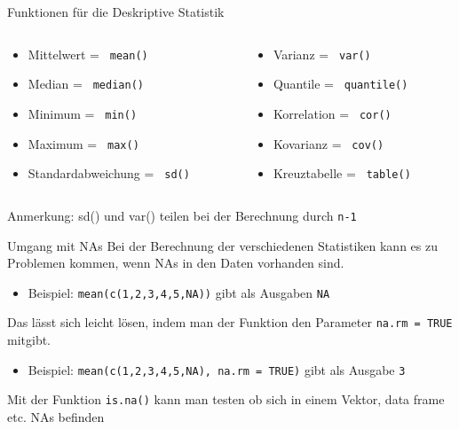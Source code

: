 \documentclass[aspectratio = 169]{chariteBeamer}
\begin{document}
\begin{frame}[fragile]{Funktionen für die Deskriptive Statistik}
\begin{columns}[T]
	\begin{column}{0.5\textwidth}
		\begin{itemize}
			\item Mittelwert = \verb+ mean() +
			\item Median = \verb+ median() +
			\item Minimum = \verb+ min() +
			\item Maximum = \verb+ max() +
			\item Standardabweichung = \verb+ sd() +
		\end{itemize}
	\end{column}
	\begin{column}{0.5\textwidth}
		\begin{itemize}
			\item Varianz = \verb+ var() +
			\item Quantile = \verb+ quantile() +
			\item Korrelation = \verb+ cor() +
			\item Kovarianz = \verb+ cov() +
			\item Kreuztabelle = \verb+ table() +
		\end{itemize}
	\end{column}
\end{columns}
Anmerkung: sd() und var() teilen bei der Berechnung durch \verb+n-1+
\end{frame}

\begin{frame}[fragile]{Umgang mit NAs}
	Bei der Berechnung der verschiedenen Statistiken kann es zu Problemen kommen, wenn NAs in den Daten vorhanden sind.\\
	\begin{itemize}
			\item Beispiel: \verb+mean(c(1,2,3,4,5,NA))+ gibt als Ausgaben \verb+NA+\\
	\end{itemize}
	Das lässt sich leicht lösen, indem man der Funktion den Parameter \verb+na.rm = TRUE+ mitgibt.\\
	\begin{itemize}
			\item Beispiel: \verb+mean(c(1,2,3,4,5,NA), na.rm = TRUE)+ gibt als Ausgabe \verb+3+
	\end{itemize}
	Mit der Funktion \verb+is.na()+ kann man testen ob sich in einem Vektor, data frame etc. NAs befinden
\end{frame}
\end{document}
